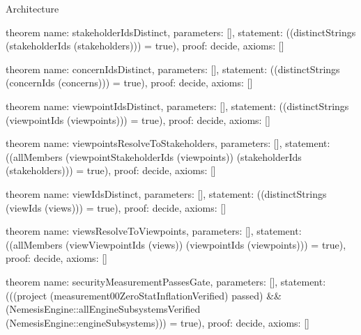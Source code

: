 \begin{lexlean}{Architecture}
\begin{semanticmodule}
theorem{
  name: stakeholderIdsDistinct,
  parameters: [],
  statement: ((distinctStrings (stakeholderIds (stakeholders))) = true),
  proof: decide{},
  axioms: []
}

theorem{
  name: concernIdsDistinct,
  parameters: [],
  statement: ((distinctStrings (concernIds (concerns))) = true),
  proof: decide{},
  axioms: []
}

theorem{
  name: viewpointIdsDistinct,
  parameters: [],
  statement: ((distinctStrings (viewpointIds (viewpoints))) = true),
  proof: decide{},
  axioms: []
}

theorem{
  name: viewpointsResolveToStakeholders,
  parameters: [],
  statement: ((allMembers (viewpointStakeholderIds (viewpoints)) (stakeholderIds (stakeholders))) = true),
  proof: decide{},
  axioms: []
}

theorem{
  name: viewIdsDistinct,
  parameters: [],
  statement: ((distinctStrings (viewIds (views))) = true),
  proof: decide{},
  axioms: []
}

theorem{
  name: viewsResolveToViewpoints,
  parameters: [],
  statement: ((allMembers (viewViewpointIds (views)) (viewpointIds (viewpoints))) = true),
  proof: decide{},
  axioms: []
}

theorem{
  name: securityMeasurementPassesGate,
  parameters: [],
  statement: (((project (measurement00ZeroStatInflationVerified) passed) && (NemesisEngine::allEngineSubsystemsVerified (NemesisEngine::engineSubsystems))) = true),
  proof: decide{},
  axioms: []
}
\end{semanticmodule}
\end{lexlean}

